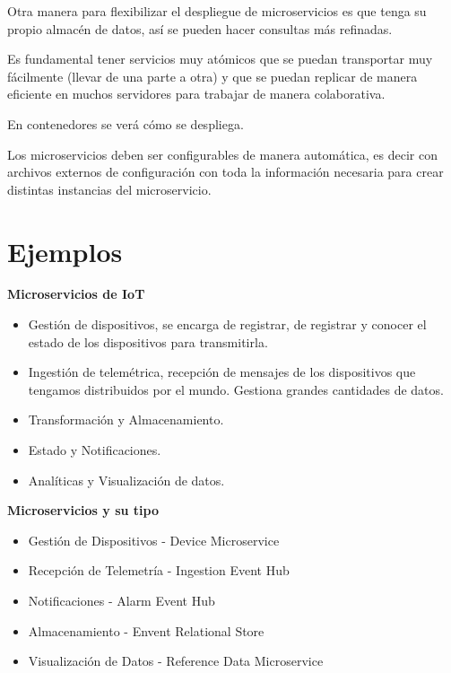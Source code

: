\documentclass[12pt]{report} %
\begin{document}
Otra manera para flexibilizar el despliegue de microservicios es que tenga su propio almacén de datos, así se pueden hacer consultas más refinadas.

Es fundamental tener servicios muy atómicos que se puedan transportar muy fácilmente (llevar de una parte a otra) y que se puedan replicar de manera eficiente en muchos servidores para trabajar de manera colaborativa.

En contenedores se verá cómo se despliega.

Los microservicios deben ser configurables de manera automática, es decir con archivos externos de configuración con toda la información necesaria para crear distintas instancias del microservicio.

\section{Ejemplos}
\textbf{Microservicios de IoT}

\begin{itemize}
	\item Gestión de dispositivos, se encarga de registrar, de registrar y conocer el estado de los dispositivos para transmitirla.
	\item Ingestión de telemétrica, recepción de mensajes de los dispositivos que tengamos distribuidos por el mundo. Gestiona grandes cantidades de datos.
	\item Transformación y Almacenamiento. 
	\item Estado y Notificaciones.
	\item Analíticas y Visualización de datos. 
\end{itemize}

\textbf{Microservicios y su tipo}
\begin{itemize}
	\item Gestión de Dispositivos - Device Microservice
	\item Recepción de Telemetría - Ingestion Event Hub
	\item Notificaciones - Alarm Event Hub
	\item Almacenamiento - Envent Relational Store
	\item Visualización de Datos - Reference Data Microservice
\end{itemize}
\end{document}
